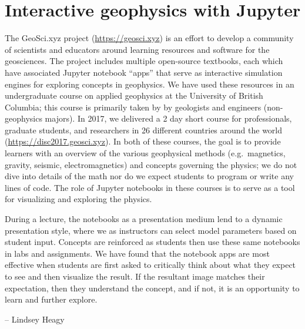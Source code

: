 \documentclass[]{book}
\begin{document}
\hypertarget{interactive-geophysics-with-jupyter}{%
\section{Interactive geophysics with Jupyter}\label{interactive-geophysics-with-jupyter}}

The GeoSci.xyz project (\url{https://geosci.xyz}) is
an effort to develop a community of scientists and educators around
learning resources and software for the geosciences. The project
includes multiple open-source textbooks, each which have associated
Jupyter notebook ``apps'' that serve as interactive simulation engines
for exploring concepts in geophysics. We have used these resources in
an undergraduate course on applied geophysics at the University of
British Columbia; this course is primarily taken by by geologists and
engineers (non-geophysics majors). In 2017, we delivered a 2 day short
course for professionals, graduate students, and researchers in 26
different countries around the world
(\url{https://disc2017.geosci.xyz}). In both
of these courses, the goal is to provide learners with an overview of
the various geophysical methods (e.g.~magnetics, gravity, seismic,
electromagnetics) and concepts governing the physics; we do not dive
into details of the math nor do we expect students to program or write
any lines of code. The role of Jupyter notebooks in these courses is
to serve as a tool for visualizing and exploring the physics.

During a lecture, the notebooks as a presentation medium lend to a
dynamic presentation style, where we as instructors can select model
parameters based on student input. Concepts are reinforced as students
then use these same notebooks in labs and assignments. We have found
that the notebook apps are most effective when students are first
asked to critically think about what they expect to see and then
visualize the result. If the resultant image matches their
expectation, then they understand the concept, and if not, it is an
opportunity to learn and further explore.

-- Lindsey Heagy
\end{document}
